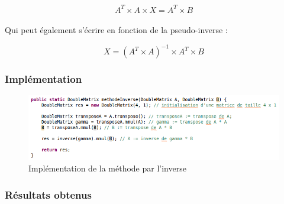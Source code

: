 \documentclass[a4paper,11pt]{article}
\begin{document}
			\begin{equation} 
				A^{T} \times A \times X  =  A^{T} \times B
			\end{equation}

			\paragraph{}
			Qui peut également s'écrire en fonction de la pseudo-inverse :

			\begin{equation} 
				X = ( A^{T} \times A)^{-1}  \times  A^{T} \times B
			\end{equation}


			\subsubsection{Implémentation}

			\begin{figure}[h]
				\centerline{\includegraphics[scale=0.50]{img/inverse.png}}
				\caption{Implémentation de la méthode par l'inverse}
				\label{diagramme-composants}
			\end{figure}


			\subsubsection{Résultats obtenus}
\end{document}
